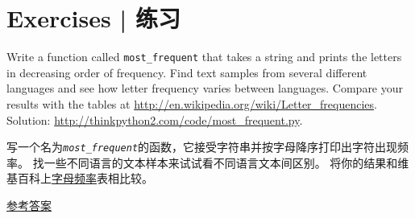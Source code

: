 \section{Exercises  |  练习}

\begin{exercise}

Write a function called \verb"most_frequent" that takes a string and
prints the letters in decreasing order of frequency.  Find text
samples from several different languages and see how letter frequency
varies between languages.  Compare your results with the tables at
\url{http://en.wikipedia.org/wiki/Letter_frequencies}.  Solution:
\url{http://thinkpython2.com/code/most_frequent.py}.

写一个名为\emph{\lstinline{most_frequent}}的函数，它接受字符串并按字母降序打印出字符出现频率。 找一些不同语言的文本样本来试试看不同语言文本间区别。 将你的结果和维基百科上\href{http://en.wikipedia.org/wiki/Letter_frequencies}{字母频率}表相比较。

\href{http://thinkpython2.com/code/most_frequent.py}{参考答案}
 
\end{exercise}


